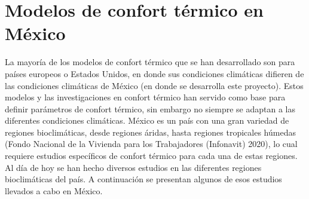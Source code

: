 \documentclass[
  12pt,
  letterpaper,
  DIV=11,
  numbers=noendperiod]{scrreport}
\begin{document}
\hypertarget{modelos-de-confort-tuxe9rmico-en-muxe9xico}{%
\section{Modelos de confort térmico en
México}\label{modelos-de-confort-tuxe9rmico-en-muxe9xico}}

La mayoría de los modelos de confort térmico que se han desarrollado son
para países europeos o Estados Unidos, en donde sus condiciones
climáticas difieren de las condiciones climáticas de México (en donde se
desarrolla este proyecto). Estos modelos y las investigaciones en
confort térmico han servido como base para definir parámetros de confort
térmico, sin embargo no siempre se adaptan a las diferentes condiciones
climáticas. México es un país con una gran variedad de regiones
bioclimáticas, desde regiones áridas, hasta regiones tropicales húmedas
(Fondo Nacional de la Vivienda para los Trabajadores (Infonavit) 2020),
lo cual requiere estudios específicos de confort térmico para cada una
de estas regiones. Al día de hoy se han hecho diversos estudios en las
diferentes regiones bioclimáticas del país. A continuación se presentan
algunos de esos estudios llevados a cabo en México.
\end{document}
